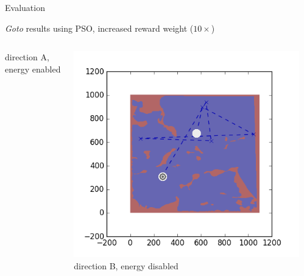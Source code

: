 \documentclass[9pt]{beamer}
\begin{document}
\begin{frame}{Evaluation}
\begin{block}{\textit{Goto} results using PSO, increased reward weight ($10\times$)}
\begin{columns}
\begin{column}{0.25\textwidth}
\begin{center}
                    \newline
                    \tiny{direction A, energy enabled}
                \end{center}
            \end{column}
            \begin{column}{0.25\textwidth}
                \begin{center}
                    \includegraphics[width=\textwidth,trim={2cm 2cm 2cm 2cm},clip]{img/EXP3RG_PathAb_-1_-1_0_0d01.png}
                    \newline
                    \tiny{direction B, energy disabled}
                \end{center}
            \end{column}
            \begin{column}{0.25\textwidth}
                \begin{center}

\end{center}
\end{column}
\end{columns}
\end{block}
\end{frame}
\end{document}
